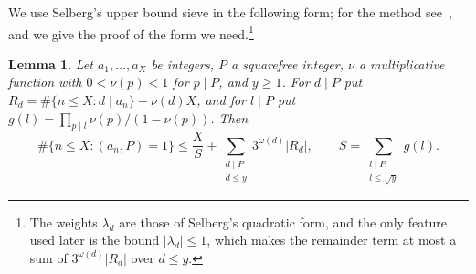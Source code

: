\documentclass[12pt]{amsart}
\numberwithin{equation}{section}
\newtheorem{lemma}[theorem]{Lemma}
\theoremstyle{definition}
\begin{document}
We use Selberg's upper bound sieve in the following form; for the method
see~\cite[Chapter~3]{HR74}, and we give the proof of the form we need.\footnote{The weights
$\lambda_d$ are those of Selberg's quadratic form, and the only feature used later is the bound
$|\lambda_d|\le1$, which makes the remainder term at most a sum of $3^{\omega(d)}|R_d|$ over
$d\le y$.}

\begin{lemma}\label{lem:selberg}
Let $a_1,\dots,a_X$ be integers, $P$ a squarefree integer, $\nu$ a multiplicative function with
$0<\nu(p)<1$ for $p\mid P$, and $y\ge1$. For $d\mid P$ put
$R_d=\#\{n\le X:d\mid a_n\}-\nu(d)X$, and for $l\mid P$ put
$g(l)=\prod_{p\mid l}\nu(p)/(1-\nu(p))$. Then
\[
  \#\{n\le X:(a_n,P)=1\}\le\frac XS+\sum_{\substack{d\mid P\\d\le y}}3^{\omega(d)}|R_d|,
  \qquad S=\sum_{\substack{l\mid P\\l\le\sqrt y}}g(l).
\]
\end{lemma}
\end{document}
